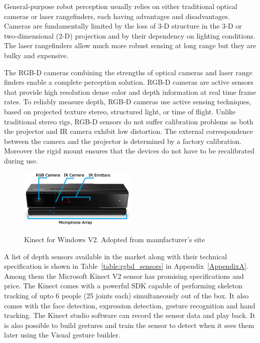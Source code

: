 General-purpose robot perception usually relies on either traditional optical cameras or laser rangefinders, each having advantages and disadvantages. Cameras are fundamentally limited by the loss of 3-D structure in the 3-D or two-dimensional (2-D) projection and by their dependency on lighting conditions. The laser rangefinders allow much more robust sensing at long range but they are bulky and expensive.  

The RGB-D cameras combining the strengths of optical cameras and laser range finders enable a complete perception solution. RGB-D cameras\cite{ren2013change} are active sensors that provide high resolution dense color and depth information at real time frame rates. To reliably measure depth, RGB-D cameras use active sensing techniques, based on projected texture stereo, structured light, or time of flight. Unlike traditional stereo rigs, RGB-D sensors do not suffer calibration problems as both the projector and IR camera exhibit low distortion. The external correspondence between the camera and the projector is determined by a factory calibration. Moreover the rigid mount ensures that the devices do not have to be recalibrated during use.
\begin{figure}[H]
\centering
\includegraphics[width=0.5\textwidth]{assets/kinectv2_parts.eps}
\label{fig:kinectv2}
\caption[Kinect for Windows V2]{Kinect for Windows V2. {Adopted from manufacturer's site}}
\end{figure}

A list of depth sensors available in the market along with their technical specification is shown in Table~\ref{table:rgbd_sensors} in Appendix~\ref{AppendixA}. Among them the Microsoft Kinect V2 \cite{Kinect2014} sensor has promising specifications and price. The Kinect comes with a powerful SDK \cite{KinectSDK2014} capable of performing skeleton tracking of upto 6 people (25 joints each) simultaneously out of the box. It also comes with the face detection, expression detection, gesture recognition and hand tracking. The Kinect studio software can record the sensor data and play back. It is also possible to build gestures and train the sensor to detect when it sees them later using the Visual gesture builder. 

